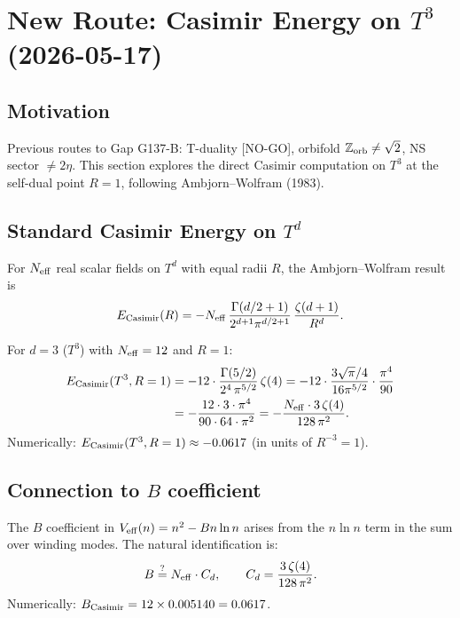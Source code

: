 \documentclass[12pt,a4paper]{article}
\begin{document}
\section{New Route: Casimir Energy on $T^3$ (2026-05-17)}
\label{sec:casimir_t3}

\subsection{Motivation}

Previous routes to Gap G137-B: T-duality [NO-GO], orbifold $\mathbb{Z}_{\rm orb} \neq \sqrt{2}$,
NS sector $\neq 2\eta$.  This section explores the direct Casimir computation
on $T^3$ at the self-dual point $R=1$, following Ambjorn--Wolfram (1983).

\subsection{Standard Casimir Energy on $T^d$}

For $N_{\rm eff}$ real scalar fields on $T^d$ with equal radii $R$,
the Ambjorn--Wolfram result is
\begin{equation}
  \label{eq:casimir_td}
  E_{\rm Casimir}(R) = -N_{\rm eff}\,
  \frac{\Gamma(d/2+1)}{2^{d+1}\pi^{d/2+1}}\,\frac{\zeta(d+1)}{R^d}.
\end{equation}

For $d=3$ ($T^3$) with $N_{\rm eff} = 12$ and $R=1$:
\begin{align}
  E_{\rm Casimir}(T^3, R=1)
  &= -12\cdot\frac{\Gamma(5/2)}{2^4\,\pi^{5/2}}\,\zeta(4)
   = -12\cdot\frac{3\sqrt{\pi}/4}{16\pi^{5/2}}\cdot\frac{\pi^4}{90} \nonumber\\
  &= -\frac{12\cdot 3\cdot\pi^4}{90\cdot 64\cdot\pi^2}
   = -\frac{N_{\rm eff}\cdot 3\,\zeta(4)}{128\,\pi^2}.
  \label{eq:casimir_t3_result}
\end{align}
Numerically: $E_{\rm Casimir}(T^3, R=1) \approx -0.0617$ (in units of $R^{-3}=1$).

\subsection{Connection to $B$ coefficient}

The $B$ coefficient in $V_{\rm eff}(n) = n^2 - Bn\ln n$ arises from the
$n\ln n$ term in the sum over winding modes.  The natural identification is:
\begin{equation}
  \label{eq:casimir_B_proposal}
  B \stackrel{?}{=} N_{\rm eff}\cdot C_d,
  \qquad C_d = \frac{3\,\zeta(4)}{128\,\pi^2}.
\end{equation}
Numerically: $B_{\rm Casimir} = 12 \times 0.005140 = 0.0617$.
\end{document}
